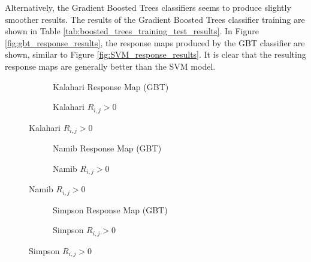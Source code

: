 Alternatively, the Gradient Boosted Trees classifiers seems to produce slightly smoother results. The results of the Gradient Boosted Trees classifier training are shown in Table \ref{tab:boosted_trees_training_test_results}. In Figure \ref{fig:gbt_response_results}, the response maps produced by the GBT classifier are shown, similar to Figure \ref{fig:SVM_response_results}. It is clear that the resulting response maps are generally better than the SVM model.

\begin{figure}[H]
	\centering
	\begin{subfigure}{0.48\textwidth}
		\centering
		\caption{Kalahari Response Map (GBT)}
		\label{fig:kalahari_gbt_response}
	\end{subfigure}
	\begin{subfigure}{0.48\textwidth}
		\centering
		\caption{ Kalahari $R_{i,j} > 0$}
		\label{fig:kalahari_gbt_response_overlay}
	\end{subfigure}
\end{figure}
\begin{figure}[H]
	\ContinuedFloat
	\centering
	\begin{subfigure}{0.48\textwidth}
		\centering
		\caption{Namib Response Map (GBT)}
		\label{fig:namib_gbt_response}
	\end{subfigure}
	\begin{subfigure}{0.48\textwidth}
		\centering
		\caption{ Namib $R_{i,j} > 0$}
		\label{fig:namib_gbt_response_overlay}
	\end{subfigure}
\end{figure}
\begin{figure}[H]
	\ContinuedFloat
	\centering
	\begin{subfigure}{0.48\textwidth}
		\centering
		\caption{Simpson Response Map (GBT)}
		\label{fig:simpson_gbt_response}
	\end{subfigure}
	\begin{subfigure}{0.48\textwidth}
		\centering
		\caption{ Simpson $R_{i,j} > 0$}
		\label{fig:simpson_gbt_response_overlay}
	\end{subfigure}
\end{figure}
